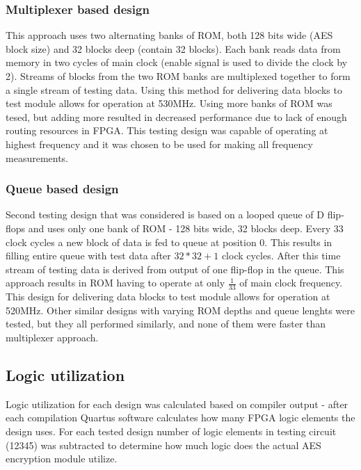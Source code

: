 \subsubsection{Multiplexer based design}
This approach uses two alternating banks of ROM, both 128 bits wide (AES block size) and 32 blocks deep (contain 32 blocks). Each bank reads data from memory in two cycles of main clock (enable signal is used to divide the clock by 2). Streams of blocks from the two ROM banks are multiplexed together to form a single stream of testing data. Using this method for delivering data blocks to test module allows for operation at 530MHz. Using more banks of ROM was tesed, but adding more resulted in decreased performance due to lack of enough routing resources in FPGA. This testing design was capable of operating at highest frequency and it was chosen to be used for making all frequency measurements.

\subsubsection{Queue based design}
Second testing design that was considered is based on a looped queue of D flip-flops and uses only one bank of ROM - 128 bits wide, 32 blocks deep. Every 33 clock cycles a new block of data is fed to queue at position 0. This results in filling entire queue with test data after $32 * 32 + 1$ clock cycles. After this time stream of testing data is derived from output of one flip-flop in the queue. This approach results in ROM having to operate at only $\frac{1}{33}$ of main clock frequency. This design for delivering data blocks to test module allows for operation at 520MHz. Other similar designs with varying ROM depths and queue lenghts were tested, but they all performed similarly, and none of them were faster than multiplexer approach.



\subsection{Logic utilization}
Logic utilization for each design was calculated based on compiler output - after each compilation Quartus software calculates how many FPGA logic elements the design uses. For each tested design number of logic elements in testing circuit (12345) was subtracted to determine how much logic does the actual AES encryption module utilize.



